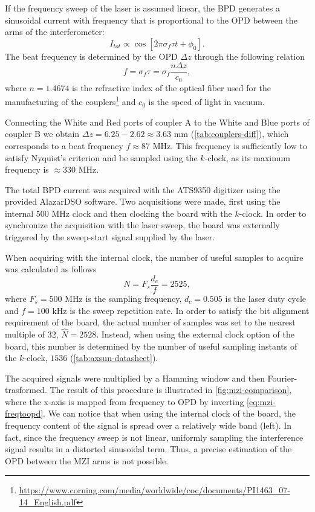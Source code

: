 If the frequency sweep of the laser is assumed linear, the \ac{BPD} generates a sinusoidal current with frequency that is proportional to the \ac{OPD} between the arms of the interferometer:
\begin{equation}
	I_{tot} \propto \cos \left[ 2\pi \sigma_f\tau t +\phi_0 \right].
\end{equation}
The beat frequency is determined by the \ac{OPD} $\Delta z$ through the following relation
\begin{equation}\label{eq:mzi-freqtoopd}
	f = \sigma_f \tau = \sigma_f \frac{n\Delta z}{c_0},
\end{equation}
where $n=1.4674$ is the refractive index of the optical fiber used for the manufacturing of the couplers\footnote{\url{https://www.corning.com/media/worldwide/coc/documents/PI1463_07-14_English.pdf}} and $c_0$ is the speed of light in vacuum. 

Connecting the White and Red ports of coupler A to the White and Blue ports of coupler B we obtain $\Delta z = 6.25-2.62\approx 3.63$ mm (\autoref{tab:couplers-diff}), which corresponds to a beat frequency $f \approx 87$ MHz. This frequency is sufficiently low to satisfy Nyquist's criterion and be sampled using the $k$-clock, as its maximum frequency is $\approx 330$ MHz. 

The total BPD current was acquired with the ATS9350 digitizer using the provided AlazarDSO software. Two acquisitions were made, first using the internal 500 MHz clock and then clocking the board with the $k$-clock. In order to synchronize the acquisition with the laser sweep, the board was externally triggered by the sweep-start signal supplied by the laser. 

When acquiring with the internal clock, the number of useful samples to acquire was calculated as follows
\begin{equation}
	N = F_s \frac{d_c}{f} = 2525,
\end{equation}
where $F_s=500$ MHz is the sampling frequency, $d_c = 0.505$ is the laser duty cycle and $f=100$ kHz is the sweep repetition rate. In order to satisfy the bit alignment requirement of the board, the actual number of samples was set to the nearest multiple of 32, $\hat{N}=2528$. Instead, when using the external clock option of the board, this number is determined by the number of useful sampling instants of the $k$-clock, $1536$ (\autoref{tab:axsun-datasheet}).  

The acquired signals were multiplied by a Hamming window and then Fourier-trasformed. The result of this procedure is illustrated in \autoref{fig:mzi-comparison}, where the x-axis is mapped from frequency to \ac{OPD} by inverting \autoref{eq:mzi-freqtoopd}. We can notice that when using the internal clock of the board, the frequency content of the signal is spread over a relatively wide band (left). In fact, since the frequency sweep is not linear, uniformly sampling the interference signal results in a distorted sinusoidal term. Thus,  a precise estimation of the OPD between the \ac{MZI} arms is not possible. 


